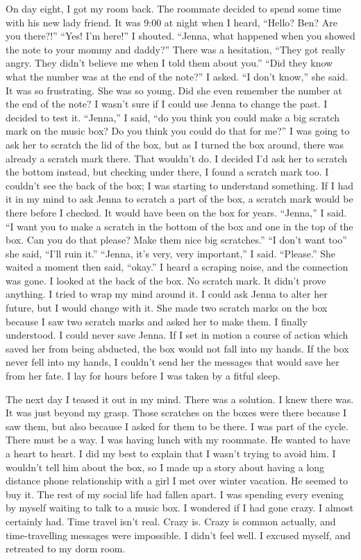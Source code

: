 \documentclass[a4paper]{article}
\begin{document}
On day eight, I got my room back. The roommate decided to spend some time with his new lady friend.
It was 9:00 at night when I heard, “Hello? Ben? Are you there?!”
“Yes! I’m here!” I shouted. “Jenna, what happened when you showed the note to your mommy and daddy?”
There was a hesitation, “They got really angry. They didn’t believe me when I told them about you.”
“Did they know what the number was at the end of the note?” I asked.
“I don’t know,” she said.
It was so frustrating. She was so young. Did she even remember the number at the end of the note?
I wasn’t sure if I could use Jenna to change the past. I decided to test it.
“Jenna,” I said, “do you think you could make a big scratch mark on the music box? Do you think you could do that for me?”
I was going to ask her to scratch the lid of the box, but as I turned the box around, there was already a scratch mark there. That wouldn’t do.
I decided I’d ask her to scratch the bottom instead, but checking under there, I found a scratch mark too. I couldn’t see the back of the box; I was starting to understand something. If I had it in my mind to ask Jenna to scratch a part of the box, a scratch mark would be there before I checked. It would have been on the box for years.
“Jenna,” I said. “I want you to make a scratch in the bottom of the box and one in the top of the box. Can you do that please? Make them nice big scratches.”
“I don’t want too” she said, “I’ll ruin it.”
“Jenna, it’s very, very important,” I said. “Please.”
She waited a moment then said, “okay.”
I heard a scraping noise, and the connection was gone.
I looked at the back of the box. No scratch mark. It didn’t prove anything.
I tried to wrap my mind around it. I could ask Jenna to alter her future, but I would change with it. She made two scratch marks on the box because I saw two scratch marks and asked her to make them.
I finally understood. I could never save Jenna. If I set in motion a course of action which saved her from being abducted, the box would not fall into my hands. If the box never fell into my hands, I couldn’t send her the messages that would save her from her fate.
I lay for hours before I was taken by a fitful sleep.

The next day I teased it out in my mind. There was a solution. I knew there was. It was just beyond my grasp.
Those scratches on the boxes were there because I saw them, but also because I asked for them to be there. I was part of the cycle. There must be a way.
I was having lunch with my roommate. He wanted to have a heart to heart. I did my best to explain that I wasn’t trying to avoid him. I wouldn’t tell him about the box, so I made up a story about having a long distance phone relationship with a girl I met over winter vacation. He seemed to buy it.
The rest of my social life had fallen apart. I was spending every evening by myself waiting to talk to a music box. I wondered if I had gone crazy. I almost certainly had.
Time travel isn’t real. Crazy is. Crazy is common actually, and time-travelling messages were impossible. I didn’t feel well. I excused myself, and retreated to my dorm room. \\ \\
\end{document}
